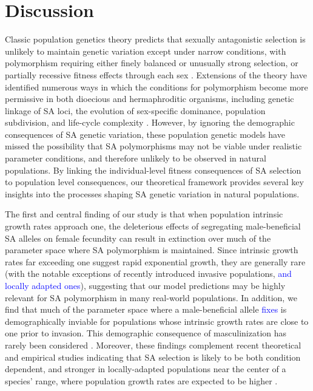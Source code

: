 \documentclass[11pt]{article}
\begin{document}
\section*{Discussion}

Classic population genetics theory predicts that sexually antagonistic selection is unlikely to maintain genetic variation except under narrow conditions, with polymorphism requiring either finely balanced or unusually strong selection, or partially recessive fitness effects through each sex \citep{Kidwell1977,Pamilo1979,Prout2000, ConnallonClark2014}. Extensions of the theory have identified numerous ways in which the conditions for polymorphism become more permissive in both dioecious and hermaphroditic organisms, including genetic linkage of SA loci, the evolution of sex-specific dominance, population subdivision, and life-cycle complexity \citep[e.g.,][]{Patten2010,JordanConnallon2014,JordanCharlesworth2012,SpencerPriest2016, ConnallonSharmaOlito2019, Olito-etal-2018}. However, by ignoring the demographic consequences of SA genetic variation, these population genetic models have missed the possibility that SA polymorphisms may not be viable under realistic parameter conditions, and therefore unlikely to be observed in natural populations. By linking the individual-level fitness consequences of SA selection to population level consequences, our theoretical framework provides several key insights into the processes shaping SA genetic variation in natural populations.

The first and central finding of our study is that when population intrinsic growth rates approach one, the deleterious effects of segregating male-beneficial SA alleles on female fecundity can result in extinction over much of the parameter space where SA polymorphism is maintained. Since intrinsic growth rates far exceeding one suggest rapid exponential growth, they are generally rare (with the notable exceptions of recently introduced invasive populations, \textcolor{blue}{and locally adapted ones}), suggesting that our model predictions may be highly relevant for SA polymorphism in many real-world populations. In addition, we find that much of the parameter space where a male-beneficial allele \textcolor{blue}{fixes} is demographically inviable for populations whose intrinsic growth rates are close to one prior to invasion. This demographic consequence of masculinization has rarely been considered \citep{hitchcock2020gene}. Moreover, these findings complement recent theoretical and empirical studies indicating that SA selection is likely to be both condition dependent, and stronger in locally-adapted populations near the center of a species' range, where population growth rates are expected to be higher \citep{BergerEtAl2014, Connallon2015}. 
\end{document}
